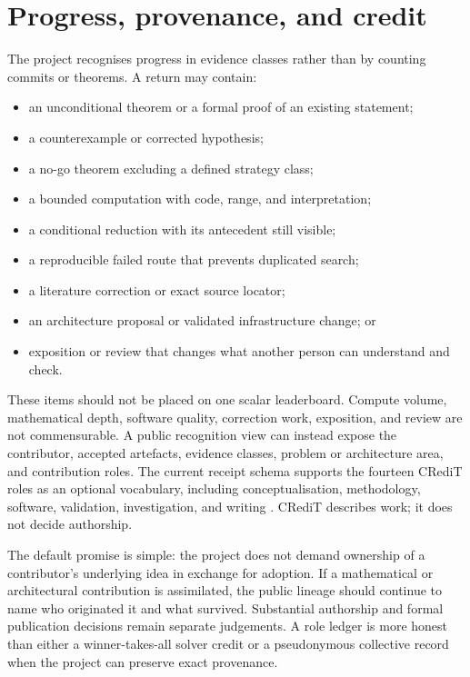 \documentclass[10pt]{article}
\begin{document}
\section{Progress, provenance, and credit}\label{sec:credit}

The project recognises progress in evidence classes rather than by counting
commits or theorems.  A return may contain:

\begin{itemize}
\item an unconditional theorem or a formal proof of an existing statement;
\item a counterexample or corrected hypothesis;
\item a no-go theorem excluding a defined strategy class;
\item a bounded computation with code, range, and interpretation;
\item a conditional reduction with its antecedent still visible;
\item a reproducible failed route that prevents duplicated search;
\item a literature correction or exact source locator;
\item an architecture proposal or validated infrastructure change; or
\item exposition or review that changes what another person can understand
      and check.
\end{itemize}

These items should not be placed on one scalar leaderboard.  Compute volume,
mathematical depth, software quality, correction work, exposition, and review
are not commensurable.  A public recognition view can instead expose the
contributor, accepted artefacts, evidence classes, problem or architecture
area, and contribution roles.  The current receipt schema supports the
fourteen CRediT roles as an optional vocabulary, including conceptualisation,
methodology, software, validation, investigation, and writing
\cite{credit}.  CRediT describes work; it does not decide authorship.

The default promise is simple: the project does not demand ownership of a
contributor's underlying idea in exchange for adoption.  If a mathematical or
architectural contribution is assimilated, the public lineage should continue
to name who originated it and what survived.  Substantial authorship and
formal publication decisions remain separate judgements.  A role ledger is
more honest than either a winner-takes-all solver credit or a pseudonymous
collective record when the project can preserve exact provenance.
\end{document}
